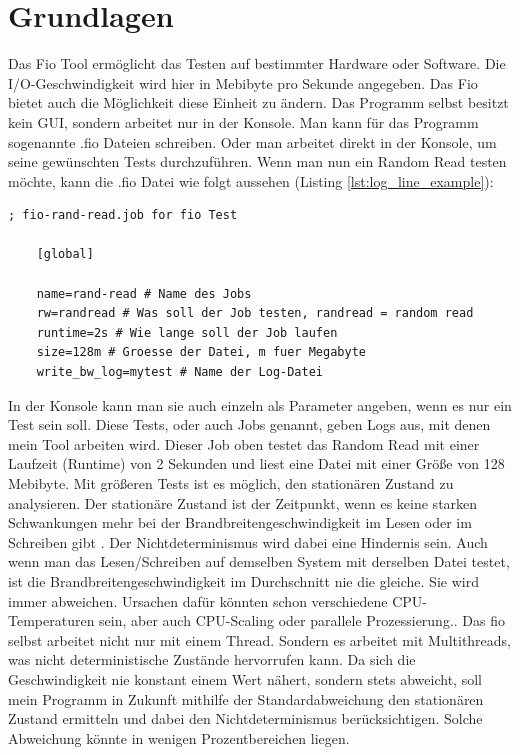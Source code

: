 \documentclass{article}
\begin{document}
\section{Grundlagen}
Das Fio Tool ermöglicht das Testen auf bestimmter Hardware oder Software. Die I/O-Geschwindigkeit wird hier in Mebibyte pro Sekunde angegeben. Das Fio bietet auch die Möglichkeit diese Einheit zu ändern.
Das Programm selbst besitzt kein GUI, sondern arbeitet nur in der Konsole. Man kann für das Programm sogenannte .fio Dateien schreiben. Oder man arbeitet direkt in der Konsole,
um seine gewünschten Tests durchzuführen.
Wenn man nun ein Random Read testen möchte, kann die .fio Datei wie folgt aussehen (Listing \ref{lst:log_line_example}):
\newpage
\begin{lstlisting}[caption=Beispiel für eine .fio Datei,label={lst:fio_file_example}]
    ; fio-rand-read.job for fio Test

    [global]

    name=rand-read # Name des Jobs
    rw=randread # Was soll der Job testen, randread = random read
    runtime=2s # Wie lange soll der Job laufen
    size=128m # Groesse der Datei, m fuer Megabyte
    write_bw_log=mytest # Name der Log-Datei
\end{lstlisting}
\bigskip
In der Konsole kann man sie auch einzeln als Parameter angeben, wenn es nur ein Test sein soll.
Diese Tests, oder auch Jobs genannt, geben Logs aus, mit denen mein Tool arbeiten wird. Dieser Job oben testet das Random Read mit einer
Laufzeit (Runtime) von 2 Sekunden und liest eine Datei mit einer Größe von 128 Mebibyte. Mit größeren Tests ist es möglich, den stationären Zustand zu analysieren. 
Der stationäre Zustand ist der Zeitpunkt, wenn es keine starken Schwankungen mehr bei der Brandbreitengeschwindigkeit im Lesen oder im Schreiben gibt \cite{vmsHotandCold}.
Der Nichtdeterminismus wird dabei eine Hindernis sein.
Auch wenn man das Lesen/Schreiben auf demselben System mit derselben Datei testet, ist die Brandbreitengeschwindigkeit im Durchschnitt nie die gleiche. Sie wird immer abweichen.
Ursachen dafür könnten schon verschiedene CPU-Temperaturen sein, aber auch CPU-Scaling oder parallele Prozessierung.\cite{stasticsInPerformance}.
Das fio selbst arbeitet nicht nur mit einem Thread. Sondern es arbeitet mit Multithreads, was nicht deterministische Zustände hervorrufen kann.
Da sich die Geschwindigkeit nie konstant einem Wert nähert, sondern stets abweicht, soll mein Programm in Zukunft mithilfe der Standardabweichung den stationären Zustand ermitteln und dabei den Nichtdeterminismus berücksichtigen.
Solche Abweichung könnte in wenigen Prozentbereichen liegen. 
\end{document}
